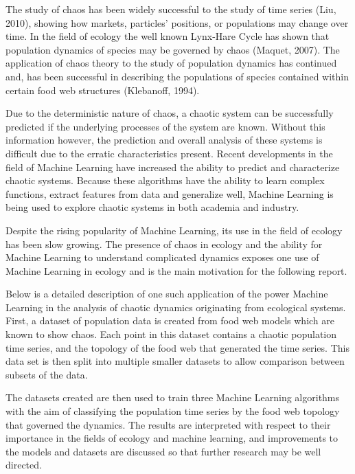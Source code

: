 \documentclass[letterpaper, 10 pt, conference]{ieeeconf}  %
\begin{document}
	The study of chaos has been widely successful to the study of time series (Liu, 2010), showing how markets, particles' positions, or populations may change over time. In the field of ecology the well known Lynx-Hare Cycle has shown that population dynamics of species may be governed by chaos (Maquet, 2007). The application of chaos theory to the study of population dynamics has continued and, has been successful in describing the populations of species contained within certain food web structures (Klebanoff, 1994).

	Due to the deterministic nature of chaos, a chaotic system can be successfully predicted if the underlying processes of the system are known. Without this information however, the prediction and overall analysis of these systems is difficult due to the erratic characteristics present. Recent developments in the field of Machine Learning have increased the ability to predict and characterize chaotic systems. Because these algorithms have the ability to learn complex functions, extract features from data and generalize well, Machine Learning is being used to explore chaotic systems in both academia and industry. 
    
	Despite the rising popularity of Machine Learning, its use in the field of ecology has been slow growing. The presence of chaos in ecology and the ability for Machine Learning to understand complicated dynamics exposes one use of Machine Learning in ecology and is the main motivation for the following report.
    
	Below is a detailed description of one such application of the power Machine Learning in the analysis of chaotic dynamics originating from ecological systems. First, a dataset of population data is created from food web models which are known to show chaos. Each point in this dataset contains a chaotic population time series, and the topology of the food web that generated the time series. This data set is then split into multiple smaller datasets to allow comparison between subsets of the data. 
    
	The datasets created are then used to train three Machine Learning algorithms with the aim of classifying the population time series by the food web topology that governed the dynamics. The results are interpreted with respect to their importance in the fields of ecology and machine learning, and improvements to the models and datasets are discussed so that further research may be well directed.  

\end{document}
